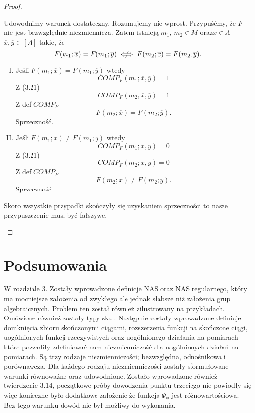 \documentclass[12pt,a4paper]{report}
\newcommand{\domkniecie}[1]{\left[ {#1} \right] }
\newcommand{\notiff}{%
  \mathrel{{\ooalign{\hidewidth$\not\phantom{"}$\hidewidth\cr$\iff$}}}}
\begin{document}
\begin{proof}
\begin{enumerate}
Udowodnimy warunek dostateczny. Rozumujemy nie wprost. Przypuśćmy, że $F$ nie jest bezwzględnie niezmiennicza. Zatem istnieją $m_1$, $m_2 \in M$ oraz$x\in A$ $\overline{x}, \overline{y} \in \domkniecie{A}$ takie, że
$$
F(m_{1};\overline{x})=F(m_{1};\overline{y}) \notiff F(m_{2};\overline{x})=F(m_{2};\overline{y}).
$$
\begin{enumerate}[I.]
\item
Jeśli $F(m_1;\overline{x})=F(m_1;\overline{y})$ wtedy
$$
COMP_{F}(m_1;\overline{x},\overline{y})=1
$$
Z (3.21)
$$
COMP_{F}(m_2;\overline{x},\overline{y})=1
$$
Z def $COMP_F$
$$
F(m_2;\overline{x})=F(m_2;\overline{y}).
$$ 
Sprzeczność.
\item
Jeśli $F(m_1;\overline{x})\ne F(m_1;\overline{y})$ wtedy 
$$
COMP_{F}(m_1;\overline{x},\overline{y})=0
$$
Z (3.21) 
$$
COMP_{F}(m_2;\overline{x},\overline{y})=0
$$
Z def $COMP_F$
$$
F(m_2;\overline{x})\ne F(m_2;\overline{y}).
$$ 
Sprzeczność.
\end{enumerate}
Skoro wszystkie przypadki skończyły się uzyskaniem sprzeczności to nasze przypuszczenie musi być fałszywe.
\end{enumerate}
\end{proof}

\chapter{Podsumowania}
W rozdziale 3. Zostały wprowadzone definicje NAS oraz NAS regularnego, który ma mocniejsze założenia od zwykłego ale jednak słabsze niż założenia grup algebraicznych. Problem ten został również zilustrowany na przykładach. Omówione również zostały typy skal. Następnie zostały wprowadzone definicje domknięcia zbioru skończonymi ciągami, rozszerzenia funkcji na skończone ciągi, uogólnionych funkcji rzeczywistych oraz uogólnionego działania na pomiarach które pozwoliły zdefiniować nam niezmienniczość dla uogólnionych działań na pomiarach. Są trzy rodzaje niezmienniczości; bezwzględna, odnośnikowa i porównawcza. Dla każdego rodzaju niezmienniczości zostały sformułowane warunki równoważne oraz udowodnione.  Zostało wprowadzone również twierdzenie 3.14, początkowe próby dowodzenia punktu trzeciego nie powiodły się więc konieczne było dodatkowe  założenie że funkcja $\Psi_{\phi}$ jest różnowartościowa. Bez tego warunku dowód nie był możliwy do wykonania.


\end{document}
